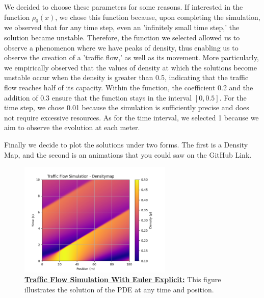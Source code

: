 \documentclass{article}
\begin{document}
	We decided to choose these parameters for some reasons. If interested in the function $\rho_0(x)$, we chose this function because, upon completing the simulation, we observed that for any time step, even an 'infinitely small time step,' the solution became unstable. Therefore, the function we selected allowed us to observe a phenomenon where we have peaks of density, thus enabling us to observe the creation of a 'traffic flow,' as well as its movement. More particularly, we empirically observed that the values of density at which the solutions become unstable occur when the density is greater than 0.5, indicating that the traffic flow reaches half of its capacity. Within the function, the coefficient 0.2 and the addition of 0.3 ensure that the function stays in the interval $[0, 0.5]$.
	For the time step, we chose 0.01 because the simulation is sufficiently precise and does not require excessive resources. As for the time interval, we selected 1 because we aim to observe the evolution at each meter.
	
	Finally we decide to plot the solutions under two forms. The first is a Density Map, and the second is an animations that you could saw on the GitHub Link.
	
	\begin{figure}[H]
		\centering
		\includegraphics[width=0.65\textwidth]{traffic_flow_density_map.png}
		\caption[Traffic Flow Simulation With Euler Explicit]{\textbf{\underline{Traffic Flow Simulation With Euler Explicit:}} This figure illustrates the solution of the PDE at any time and position.}
		\label{fig:traffic_flow_density_map}
	\end{figure}
	
\end{document}
